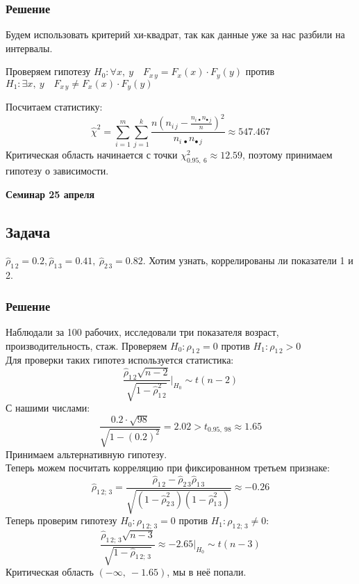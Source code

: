 \documentclass[12pt, a4paper]{article}
\begin{document}
\subsubsection*{Решение}
Будем использовать критерий хи-квадрат, так как данные уже за нас разбили на интервалы.

\noindent
Проверяем гипотезу $H_0: \forall x,\ y\quad  F_{x\, y} = F_x(x) \cdot F_y(y)$ против $H_1: \exists x,\ y\quad  F_{x\, y} \neq F_x(x) \cdot F_y(y) $

\noindent
Посчитаем статистику:
\[\hat \chi^2 = \sum_{i = 1}^{m} \sum_{j = 1}^{k} \frac{ n {\left( n_{i\, j} - \frac{n_{i\, \bullet} n_{\bullet\, j}}{n} \right)}^2 }{ n_{i\, \bullet} n_{\bullet\, j} } \approx 547.467\]
Критическая область начинается с точки $\chi^2_{0.95,\ 6} \approx 12.59$, поэтому принимаем гипотезу о зависимости.
\newpage
\begin{center}
    \bf Семинар 25 апреля
\end{center}
\subsection*{Задача}
$\hat \rho_{1\, 2} = 0.2, \hat \rho_{1\, 3} = 0.41,\ \hat \rho_{2\, 3} = 0.82$. Хотим узнать, коррелированы ли показатели 1 и 2.
\subsubsection*{Решение}
Наблюдали за 100 рабочих, исследовали три показателя возраст, производительность, стаж.
Проверяем $H_0: \rho_{1\, 2} = 0$ против $H_1: \rho_{1\, 2} > 0$\\
Для проверки таких гипотез используется статистика:
\[
\frac{\hat \rho_{1\, 2} \sqrt{n - 2}}{\sqrt{1 - \hat \rho^2_{1\, 2}}} \Bigg|_{H_0} \sim t(n - 2)
\]
С нашими числами:
\[
\frac{0.2 \cdot \sqrt{98}}{\sqrt{1 - (0.2)^2}} = 2.02 > t_{0.95,\ 98} \approx 1.65
\]
Принимаем альтернативную гипотезу.\\
Теперь можем посчитать корреляцию при фиксированном третьем признаке:
\[
\hat \rho_{1\, 2;\, 3} = \frac{\hat \rho_{1\, 2} - \hat \rho_{2\, 3} \hat \rho_{1\, 3}}{\sqrt{(1 - \hat \rho_{2\, 3}^2) (1 - \hat \rho^2_{1\, 3})}} \approx -0.26
\]
Теперь проверим гипотезу $H_0: \rho_{1\, 2;\, 3} = 0$ против $H_1: \rho_{1\, 2;\, 3} \neq 0$:
\[
\frac{\hat \rho_{1\, 2;\, 3} \sqrt{n - 3}}{\sqrt{1 - \hat \rho_{1\, 2;\, 3}}} \approx -2.65\Big|_{H_0} \sim t(n - 3)
\]
Критическая область $(-\infty,\ -1.65)$, мы в неё попали.
\end{document}
